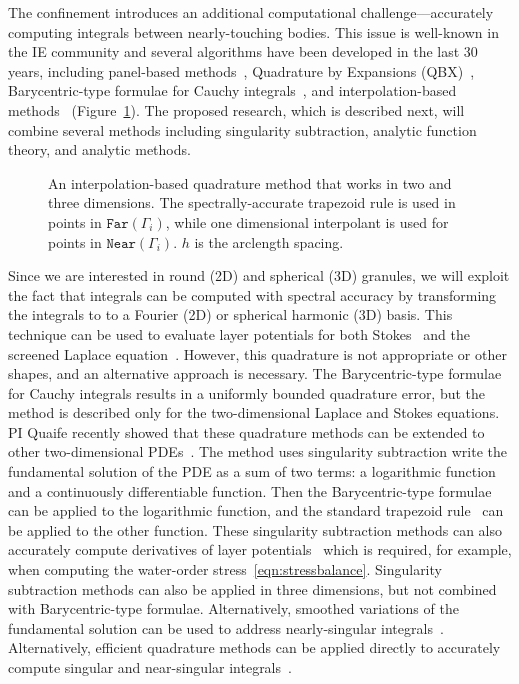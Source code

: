 The confinement introduces an additional computational
challenge---accurately computing integrals between nearly-touching
bodies. This issue is well-known in the IE community and several
algorithms have been developed in the last 30 years, including
panel-based methods~\cite{helsing_2008a, helsing_tutorial_2012},
Quadrature by Expansions (QBX)~\cite{din-hua-mar-tan2021,
klo-bar-gre-one2013, ste-bar2022, af2018sisc}, Barycentric-type formulae
for Cauchy integrals~\cite{bar2014, bar-wu-vee2015, ioa-pap-per1991},
and interpolation-based methods~\cite{ying_2006, qua-bir2014,
rah-vee-zor-bir2015} (Figure~\ref{fig:interpquad}). The proposed
research, which is described next, will combine several methods
including singularity subtraction, analytic function theory, and
analytic methods.

\begin{figure}
  \centering
  
  \caption{\label{fig:interpquad} \footnotesize An interpolation-based
  quadrature method that works in two and three dimensions. The
  spectrally-accurate trapezoid rule is used in points in
  $\mathtt{Far}(\Gamma_i)$, while one dimensional interpolant is used
  for points in $\mathtt{Near}(\Gamma_i)$. $h$ is the arclength
  spacing.}
\end{figure}

Since we are interested in round (2D) and spherical (3D) granules, we
will exploit the fact that integrals can be computed with spectral
accuracy by transforming the integrals to to a Fourier (2D) or spherical
harmonic (3D) basis. This technique can be used to evaluate layer
potentials for both Stokes~\cite{cor-vee2018} and the screened Laplace
equation~\cite{koh-cor-che-vee2021}. However, this quadrature is not
appropriate or other shapes, and an alternative approach is necessary.
The Barycentric-type formulae for Cauchy integrals results in a
uniformly bounded quadrature error, but the method is described only for
the two-dimensional Laplace and Stokes equations. PI Quaife recently
showed that these quadrature methods can be extended to other
two-dimensional PDEs~\cite{che-lin-her-qua2022}. The method uses
singularity subtraction write the fundamental solution of the PDE as a
sum of two terms: a logarithmic function and a continuously
differentiable function. Then the Barycentric-type formulae can be
applied to the logarithmic function, and the standard trapezoid
rule~\cite{tre-wei2014} can be applied to the other function. These
singularity subtraction methods can also accurately compute derivatives
of layer potentials~\cite{car2021, car2020, car-kha-kim2018} which is
required, for example, when computing the water-order
stress~\eqref{eqn:stressbalance}. Singularity subtraction methods can
also be applied in three dimensions, but not combined with
Barycentric-type formulae. Alternatively, smoothed variations of the
fundamental solution can be used to address nearly-singular
integrals~\cite{beale1, cor2001, tlu-bea2019}. Alternatively, efficient
quadrature methods can be applied directly to accurately compute
singular and near-singular integrals~\cite{khayat_2005,
gimbutas2013sisc}.

